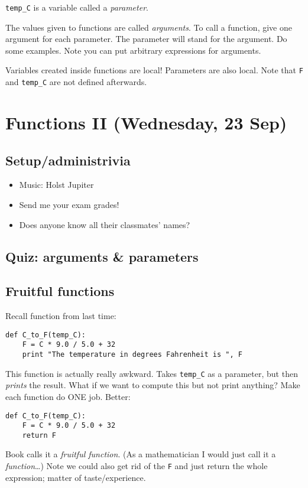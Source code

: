\documentclass{article}
\begin{document}
\verb|temp_C| is a variable called a \emph{parameter}.

The values given to functions are called \emph{arguments}.  To call a
function, give one argument for each parameter.  The parameter will
stand for the argument.  Do some examples.  Note you can put arbitrary
expressions for arguments.

Variables created inside functions are local!  Parameters are also
local. Note that \verb|F| and \verb|temp_C| are not defined afterwards.

\section*{Functions II (Wednesday, 23 Sep)}

\subsection*{Setup/administrivia}
\begin{itemize}
\item Music: Holst Jupiter
\item Send me your exam grades!
\item Does anyone know all their classmates' names?
\end{itemize}

\subsection*{Quiz: arguments \& parameters}

\subsection*{Fruitful functions}

Recall function from last time:
\begin{verbatim}
def C_to_F(temp_C):
    F = C * 9.0 / 5.0 + 32
    print "The temperature in degrees Fahrenheit is ", F
\end{verbatim}
This function is actually really awkward.  Takes \verb|temp_C| as a
parameter, but then \emph{prints} the result.  What if we want to
compute this but not print anything?  Make each function do ONE job.
Better:
\begin{verbatim}
def C_to_F(temp_C):
    F = C * 9.0 / 5.0 + 32
    return F
\end{verbatim}
Book calls it a \emph{fruitful function}.  (As a mathematician I would
just call it a \emph{function}\dots) Note we could also get rid of the
\verb|F| and just return the whole expression; matter of
taste/experience.
\end{document}
